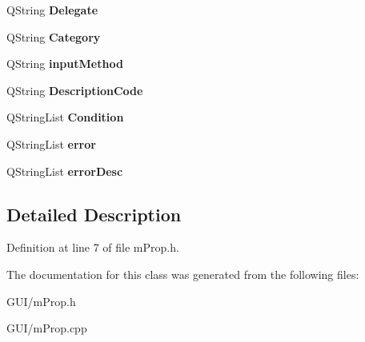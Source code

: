\begin{DoxyCompactItemize}
Q\+String {\bfseries Delegate}
\item 
\mbox{\label{classm_prop_aea3ca22df4933d3eb71bc15ed46e74e6}} 
Q\+String {\bfseries Category}
\item 
\mbox{\label{classm_prop_a717549055d5cbc311a92ee7a38cdf861}} 
Q\+String {\bfseries input\+Method}
\item 
\mbox{\label{classm_prop_a60ce8c526c5719b206658a3984457e38}} 
Q\+String {\bfseries Description\+Code}
\item 
\mbox{\label{classm_prop_a7c1a2300fdfffeb6576ffad5043234c2}} 
Q\+String\+List {\bfseries Condition}
\item 
\mbox{\label{classm_prop_ae7cfe400ee3cdeba2228b94e47e65bfa}} 
Q\+String\+List {\bfseries error}
\item 
\mbox{\label{classm_prop_a95fffea787bec40aa1fd1f013406c7ef}} 
Q\+String\+List {\bfseries error\+Desc}
\end{DoxyCompactItemize}


\subsection{Detailed Description}


Definition at line 7 of file m\+Prop.\+h.



The documentation for this class was generated from the following files\+:\begin{DoxyCompactItemize}
\item 
G\+U\+I/m\+Prop.\+h\item 
G\+U\+I/m\+Prop.\+cpp\end{DoxyCompactItemize}
